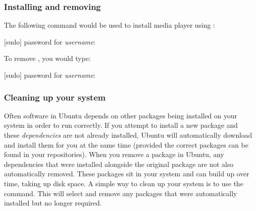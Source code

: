 \subsubsection{Installing and removing}

The following command would be used to install  media player using
:

\begin{terminal}
\prompt {}
[sudo] password for \emph{username}:
\end{terminal}

To remove , you would type:

\begin{terminal}
\prompt {}
[sudo] password for \emph{username}:
\end{terminal}

\subsubsection{Cleaning up your system}

Often software in Ubuntu depends on other packages being installed on your system in order to run correctly. If you attempt to install a new package and these \emph{dependencies} are not already installed, Ubuntu will automatically download and install them for you at the same time (provided the correct packages can be found in your repositories). When you remove a package in Ubuntu, any dependencies that were installed alongside the original package are not also automatically removed. These packages sit in your system and can build up over time, taking up disk space. A simple way to clean up your system is to use the   command.  This will select and remove any packages that were automatically installed but no longer required.

\begin{terminal}
\prompt {}
\end{terminal}

